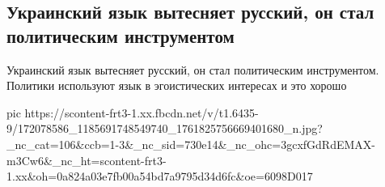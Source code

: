  
 
 
 
 

\subsection{Украинский язык вытесняет русский, он стал политическим инструментом}

Украинский язык вытесняет русский, он стал политическим инструментом. Политики
используют язык в эгоистических интересах и это хорошо

\ifcmt
  pic https://scontent-frt3-1.xx.fbcdn.net/v/t1.6435-9/172078586_1185691748549740_1761825756669401680_n.jpg?_nc_cat=106&ccb=1-3&_nc_sid=730e14&_nc_ohc=3gcxfGdRdEMAX-m3Cw6&_nc_ht=scontent-frt3-1.xx&oh=0a824a03e7fb00a54bd7a9795d34d6fc&oe=6098D017
\fi

